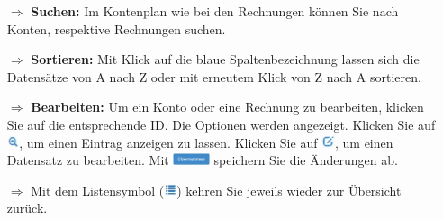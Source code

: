 \documentclass{article}
\begin{document}
\begin{multicols}{2}
\begin{tcolorbox}[colback=blue!5,colframe=blue!40!black,title=Weitere Funktionen im Controlling]
\begin{itemize}
  \item[$\Longrightarrow$] \textbf{Suchen:} Im Kontenplan wie bei den Rechnungen können Sie nach Konten, respektive Rechnungen suchen.
  \item[$\Longrightarrow$] \textbf{Sortieren:} Mit Klick auf die blaue Spaltenbezeichnung lassen sich die Datensätze von A nach Z oder mit erneutem Klick von Z nach A sortieren.
  \item[$\Longrightarrow$] \textbf{Bearbeiten:} Um ein Konto oder eine Rechnung zu bearbeiten, klicken Sie auf die entsprechende ID. Die Optionen werden angezeigt. Klicken Sie auf \includegraphics[height=10pt]{Icons/Lupe.jpg}, um einen Eintrag anzeigen zu lassen. Klicken Sie auf \includegraphics[height=10pt]{Icons/bearbeiten.jpg}, um einen Datensatz zu bearbeiten. Mit \includegraphics[height=10pt]{Icons/B_Uebernehmen.jpg} speichern Sie die Änderungen ab.
	\item[$\Longrightarrow$] Mit dem Listensymbol (\includegraphics[height=10pt]{Icons/Listensymbol_zurueck.jpg}) kehren Sie jeweils wieder zur Übersicht zurück.
\end{itemize}
\end{tcolorbox}


\end{multicols}



\end{document}
